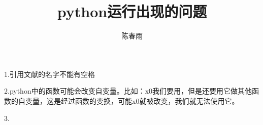 \documentclass{article}
\begin{document}
\title{python运行出现的问题}
\author{陈春雨}
\date{\chntoday}
\maketitle
1.引用文献的名字不能有空格

2.python中的函数可能会改变自变量。比如：x0我们要用，但是还要用它做其他函数的自变量，这是经过函数的变换，可能x0就被改变，我们就无法使用它。

3.
\cite{曲连忠2009渗透率各向异性疏松砂岩脱砂压裂产能流固耦合模拟}


\end{document}
